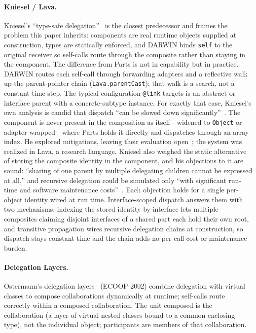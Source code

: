 \documentclass[acmsmall,nonacm]{acmart}
\theoremstyle{acmplain}
\theoremstyle{acmdefinition}
\newcommand{\code}[1]{\texttt{#1}}
\begin{document}
\paragraph{Kniesel / Lava.}
Kniesel's ``type-safe delegation''~\cite{kniesel1999,kniesel2000} is the closest
predecessor and frames the problem this paper inherits: components are real
runtime objects supplied at construction, types are statically enforced, and
DARWIN binds \texttt{self} to the original receiver so self-calls route through
the composite rather than staying in the component. The difference from Parts is
not in capability but in practice. DARWIN routes each self-call through forwarding adapters and a reflective walk
up the parent-pointer chain (\code{Lava.parentCast}); that walk is a search, not
a constant-time step. The typical configuration \code{@link} targets is an abstract or interface
parent with a concrete-subtype instance. For exactly that case, Kniesel's own
analysis is candid that dispatch ``can be slowed down
significantly''~\cite[\S7.4.2]{kniesel2000}. The component is never
present in the composition as itself---widened to \code{Object} or
adapter-wrapped---where Parts holds it directly and dispatches through an array
index. He explored mitigations, leaving their evaluation
open~\cite[\S7.5.5]{kniesel2000}; the system was realized in Lava, a research
language. Kniesel also weighed the static
alternative of storing the composite identity in the component, and his objections
to it are sound: ``sharing of one parent by multiple delegating children
cannot be expressed at all,'' and recursive delegation could be simulated only
``with significant run-time and software maintenance costs''~\cite{kniesel1999}.
Each objection holds for a single per-object identity wired at run time.
Interface-scoped dispatch answers them with two mechanisms:
indexing the stored identity by interface lets multiple composites claiming disjoint
interfaces of a shared part each hold their own root, and transitive propagation
wires recursive delegation chains at construction, so dispatch stays constant-time
and the chain adds no per-call cost or maintenance burden.

\paragraph{Delegation Layers.}
Ostermann's delegation layers~\cite{ostermann2002} (ECOOP 2002) combine
delegation with virtual classes to compose collaborations dynamically at
runtime; self-calls route correctly within a composed collaboration. The unit
composed is the collaboration (a layer of virtual nested classes bound to a
common enclosing type), not the individual object; participants are members of
that collaboration.
\end{document}
